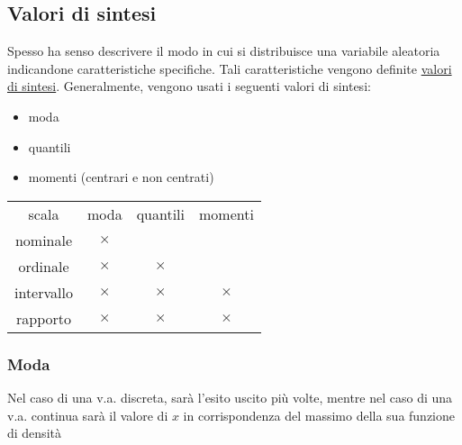 \subsection{Valori di sintesi}
Spesso ha senso descrivere il modo in cui si distribuisce una variabile aleatoria indicandone caratteristiche specifiche. Tali caratteristiche vengono definite \underline{valori di sintesi}. Generalmente, vengono usati i seguenti valori di sintesi:
\begin{itemize}
	\item moda
	\item quantili
	\item momenti (centrari e non centrati)
\end{itemize}
\begin{table}[h!]
	\centering
	\begin{tabular}{|c c c c|}
		\hline
		scala      & moda        & quantili     & momenti     \\
		nominale   & $ \times $  &              &             \\
		ordinale   & $ \times $  & $ \times  $  &             \\
		intervallo & $ \times  $ & $ \times  $  & $ \times  $ \\
		rapporto   & $ \times  $ & $  \times  $ & $ \times  $ \\
		\hline
	\end{tabular}
\end{table}
\subsubsection*{Moda}
Nel caso di una v.a. discreta, sarà l'esito uscito più volte, mentre nel caso di una v.a. continua sarà il valore di $ x $ in corrispondenza del massimo della sua funzione di densità
